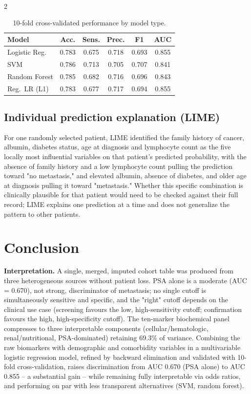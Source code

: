 ﻿\documentclass[a4paper,10pt]{article}
\begin{document}
\begin{multicols*}{2}
\begin{table}[H]
\centering
\caption{10-fold cross-validated performance by model type.}
\label{tab:modelcomp}
\begin{tabular}{lccccc}
\toprule
Model & Acc. & Sens. & Prec. & F1 & AUC \\
\midrule
Logistic Reg. & 0.783 & 0.675 & 0.718 & 0.693 & 0.855 \\
SVM & 0.786 & 0.713 & 0.705 & 0.707 & 0.841 \\
Random Forest & 0.785 & 0.682 & 0.716 & 0.696 & 0.843 \\
Reg.\ LR (L1) & 0.783 & 0.677 & 0.717 & 0.694 & 0.855 \\
\bottomrule
\end{tabular}
\end{table}

\subsection{Individual prediction explanation (LIME)}
For one randomly selected patient, LIME identified the family history of cancer, albumin, diabetes status, age at diagnosis and lymphocyte count as the five locally most influential variables on that patient's predicted probability, with the absence of family history and a low lymphocyte count pulling the prediction toward "no metastasis," and elevated albumin, absence of diabetes, and older age at diagnosis pulling it toward "metastasis." Whether this specific combination is clinically plausible for that patient would need to be checked against their full record; LIME explains one prediction at a time and does not generalize the pattern to other patients.

\section{Conclusion}

\textbf{Interpretation.} A single, merged, imputed cohort table was produced from three heterogeneous sources without patient loss. PSA alone is a moderate (AUC = 0.670), not strong, discriminator of metastasis; no single cutoff is simultaneously sensitive and specific, and the "right" cutoff depends on the clinical use case (screening favours the low, high-sensitivity cutoff; confirmation favours the high, high-specificity cutoff). The ten-marker biochemical panel compresses to three interpretable components (cellular/hematologic, renal/nutritional, PSA-dominated) retaining 69.3\% of variance. Combining the raw biomarkers with demographic and comorbidity variables in a multivariable logistic regression model, refined by backward elimination and validated with 10-fold cross-validation, raises discrimination from AUC 0.670 (PSA alone) to AUC 0.855 -- a substantial gain -- while remaining fully interpretable via odds ratios, and performing on par with less transparent alternatives (SVM, random forest).


\end{multicols*}
\end{document}
